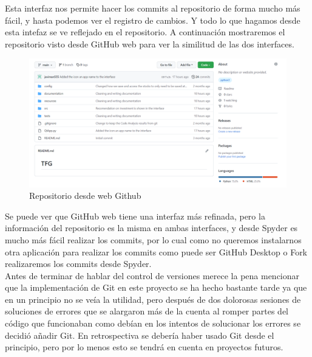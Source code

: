 \documentclass[12pt,a4paper]{article}
\begin{document}
	Esta interfaz nos permite hacer los commits al repositorio de forma mucho más fácil, y hasta podemos ver el registro de cambios. Y todo lo que hagamos desde esta intefaz se ve reflejado en el repositorio. A continuación mostraremos el repositorio visto desde GitHub web para ver la similitud de las dos interfaces.\\
\begin{figure}[H]
\centering
  \centering
  \includegraphics[width=1\linewidth]{github}
\caption{Repositorio desde web Github}
\label{fig:subrgrafo}
\end{figure}
	Se puede ver que GitHub web tiene una interfaz más refinada, pero la información del repositorio es la misma en ambas interfaces, y desde Spyder es mucho más fácil realizar los commits, por lo cual como no queremos instalarnos otra aplicación para realizar los commits como puede ser GitHub Desktop o Fork realizaremos los commits desde Spyder.\\
	Antes de terminar de hablar del control de versiones merece la pena mencionar que la implementación de Git en este proyecto se ha hecho bastante tarde ya que en un principio no se veía la utilidad, pero después de dos dolorosas sesiones de soluciones de errores que se alargaron más de la cuenta al romper partes del código que funcionaban como debían en los intentos de solucionar los errores se decidió añadir Git. En retrospectiva se debería haber usado Git desde el principio, pero por lo menos esto se tendrá en cuenta en proyectos futuros.\\
	
	
\end{document}
